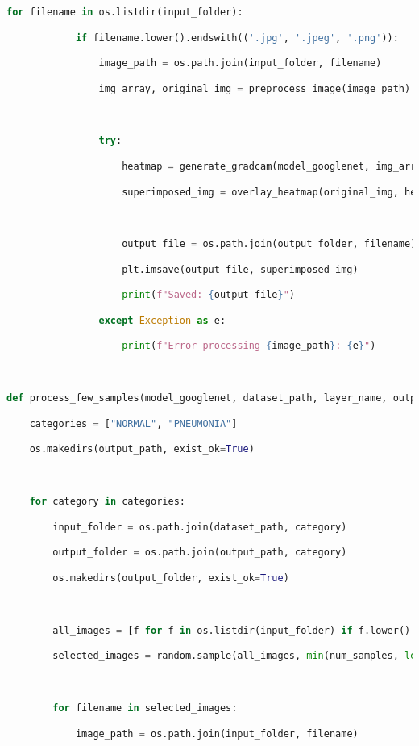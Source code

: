 \documentclass{article}
\begin{document}
\begin{lstlisting}[style=mystyle,language=Python]
        for filename in os.listdir(input_folder):

            if filename.lower().endswith(('.jpg', '.jpeg', '.png')):

                image_path = os.path.join(input_folder, filename)

                img_array, original_img = preprocess_image(image_path)



                try:

                    heatmap = generate_gradcam(model_googlenet, img_array, layer_name)

                    superimposed_img = overlay_heatmap(original_img, heatmap)



                    output_file = os.path.join(output_folder, filename)

                    plt.imsave(output_file, superimposed_img)

                    print(f"Saved: {output_file}")

                except Exception as e:

                    print(f"Error processing {image_path}: {e}")



def process_few_samples(model_googlenet, dataset_path, layer_name, output_path, num_samples=5):

    categories = ["NORMAL", "PNEUMONIA"]

    os.makedirs(output_path, exist_ok=True)



    for category in categories:

        input_folder = os.path.join(dataset_path, category)

        output_folder = os.path.join(output_path, category)

        os.makedirs(output_folder, exist_ok=True)



        all_images = [f for f in os.listdir(input_folder) if f.lower().endswith(('.jpg', '.jpeg', '.png'))]

        selected_images = random.sample(all_images, min(num_samples, len(all_images)))



        for filename in selected_images:

            image_path = os.path.join(input_folder, filename)


\end{lstlisting}
\end{document}
